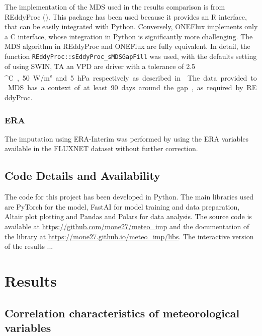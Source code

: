 \documentclass{article}
\let\Oldsection\section
\renewcommand{\section}{\FloatBarrier\Oldsection}
\let\Oldsubsection\subsection
\renewcommand{\subsection}{\FloatBarrier\Oldsubsection}
\begin{document}
The implementation of the MDS used in the results comparison is from REddyProc (\cite{wutzler_basic_2018}). This package has been used because it provides an R interface, that can be easily integrated with Python. Conversely, ONEFlux implements only a C interface, whose integration in Python is significantly more challenging.  The MDS algorithm in REddyProc and ONEFlux are fully equivalent. In detail, the function \verb|REddyProc::sEddyProc_sMDSGapFill| was used, with the defaults setting of using SW\textunderscore IN, TA an VPD are driver with a tolerance of 2.5 \si{^\circ C}, 50 \si{W/m^s} and 5 \si{hPa} respectively as described in \cite{reichstein_separation_2005}.
The data provided to MDS has a context of at least 90 days around the gap, as required by REddyProc. 

\subsubsection{ERA} The imputation using ERA-Interim was performed by using the ERA variables available in the FLUXNET dataset without further correction.

\subsection{Code Details and Availability}

The code for this project has been developed in Python. The main libraries used are PyTorch for the model,  FastAI for model training and data preparation, Altair plot plotting and Pandas and Polars for data analysis. The source code is available at \url{https://github.com/mone27/meteo_imp} and the documentation of the library at \url{https://mone27.github.io/meteo_imp/libs}. %
The interactive version of the results ...
\pagebreak

\section{Results}

\subsection{Correlation characteristics of meteorological variables}
\end{document}
